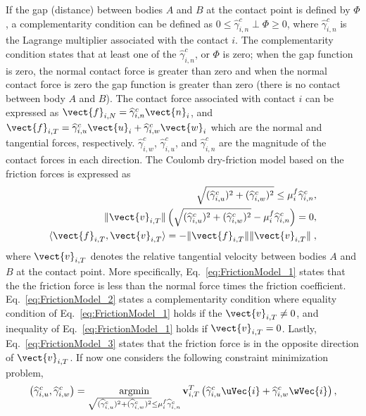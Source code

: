 If the gap (distance) between bodies $A$ and $B$ at the contact point is defined by $\Phi$, a complementarity condition can be defined as $0 \leq \widehat{\gamma}^c_{i,n}  \perp \Phi \geq 0$, where $\widehat{\gamma}^c_{i,n}$  is the Lagrange multiplier associated with the contact $i$. The complementarity condition states that at least one of the $\widehat{\gamma}^c_{i,n}$, or $\Phi$ is zero; when the gap function is zero, the normal contact force is greater than zero and when the normal contact force is zero the gap function is greater than zero (there is no contact between body $A$ and $B$). The contact force associated with contact $i$ can be expressed as $\vect{f}_{i,N}=\widehat{\gamma}^c_{i,n}\vect{n}_i$, and $\vect{f}_{i,T}=\widehat{\gamma}^c_{i,u}\vect{u}_i+\widehat{\gamma}^c_{i,w}\vect{w}_i$ which are the normal and tangential forces, respectively.  $\widehat{\gamma}^c_{i,w}$, $\widehat{\gamma}^c_{i,u}$, and $\widehat{\gamma}^c_{i,n}$ are the magnitude of the contact forces in each direction. The Coulomb dry-friction model based on the friction forces is expressed as  \cite{StTr95,stewartSIAMreview2000}
\begin{subequations}
	\begin{align}
	\label{eq:FrictionModel_1}
	\sqrt{(\widehat{\gamma}^c_{i,u})^2+(\widehat{\gamma}^c_{i,w})^2}\leq \mu^f_{i} \widehat{\gamma}^c_{i,n}&,\\ 
	\label{eq:FrictionModel_2}
	\quad \lVert\vect{v}_{i,T}\rVert\left(\sqrt{(\widehat{\gamma}^c_{i,u})^2+(\widehat{\gamma}^c_{i,w})^2} - \mu^f_{i} \widehat{\gamma}^c_{i,n} \right)=0&,\\
	\label{eq:FrictionModel_3}
	\langle\vect{f}_{i,T},\vect{v}_{i,T}\rangle=-\lVert\vect{f}_{i,T}\rVert\lVert\vect{v}_{i,T}\rVert \;&,
	\end{align}
\end{subequations}
where $\vect{v}_{i,T}$ denotes the relative tangential velocity between bodies $A$ and $B$ at the contact point. More specifically, Eq.~\ref{eq:FrictionModel_1} states that the the friction force is less than the normal force times the friction coefficient.  Eq.~\ref{eq:FrictionModel_2} states a complementarity condition where equality condition of Eq.~\ref{eq:FrictionModel_1} holds if the $\vect{v}_{i,T}\not=0$, and inequality of Eq.~\ref{eq:FrictionModel_1} holds if $\vect{v}_{i,T}=0$. Lastly, Eq.~\ref{eq:FrictionModel_3} states that the friction force is in the opposite direction of $\vect{v}_{i,T}$. If now one considers the following constraint minimization problem, 
\begin{equation}
\label{eq:fricMin}
\left( \widehat{\gamma}^c_{i,u},\widehat{\gamma}^c_{i,w} \right) = \mathop {\mbox{argmin}}\limits_{\sqrt{(\widehat{\gamma}^c_{i,u})^2+(\widehat{\gamma}^c_{i,w})^2} \leq \mu^f_{i} \widehat{\gamma}^c_{i,n}}
{\mathbf v}_{i,T}^T \left( \widehat{\gamma}^c_{i,u} \uVec{i} + \widehat{\gamma}^c_{i,w} \wVec{i} \right),
\end{equation}
